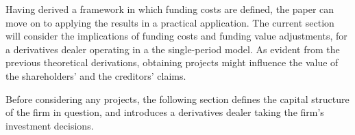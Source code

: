 \documentclass[main.tex]{subfiles}
\begin{document}
    Having derived a framework in which funding costs are defined, 
    the paper can move on to applying the results in a practical application.
    The current section will consider the implications of funding costs and funding value adjustments,
    for a derivatives dealer operating in a the single-period model.
    As evident from the previous theoretical derivations, 
    obtaining projects might influence the value of the shareholders' and the creditors' claims.

    Before considering any projects, 
    the following section defines the capital structure of the firm in question,
    and introduces a derivatives dealer taking the firm's investment decisions. 
\end{document}
